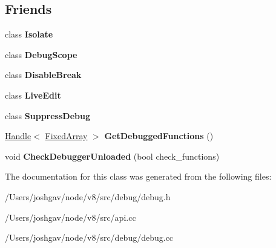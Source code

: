 \subsection*{Friends}
\begin{DoxyCompactItemize}
\item 
class {\bfseries Isolate}\hypertarget{classv8_1_1internal_1_1_debug_aba4f0964bdacf2bbf62cf876e5d28d0a}{}\label{classv8_1_1internal_1_1_debug_aba4f0964bdacf2bbf62cf876e5d28d0a}

\item 
class {\bfseries Debug\+Scope}\hypertarget{classv8_1_1internal_1_1_debug_a6cfbb0b64c1cf8e4443dc7e5900d8391}{}\label{classv8_1_1internal_1_1_debug_a6cfbb0b64c1cf8e4443dc7e5900d8391}

\item 
class {\bfseries Disable\+Break}\hypertarget{classv8_1_1internal_1_1_debug_ab05c0a5dd1563dece5579c13b74f5011}{}\label{classv8_1_1internal_1_1_debug_ab05c0a5dd1563dece5579c13b74f5011}

\item 
class {\bfseries Live\+Edit}\hypertarget{classv8_1_1internal_1_1_debug_a8ec7b8802068537635d90721ff6dc475}{}\label{classv8_1_1internal_1_1_debug_a8ec7b8802068537635d90721ff6dc475}

\item 
class {\bfseries Suppress\+Debug}\hypertarget{classv8_1_1internal_1_1_debug_a63087cbd2f6e778d5ceeb41df0a0bdc7}{}\label{classv8_1_1internal_1_1_debug_a63087cbd2f6e778d5ceeb41df0a0bdc7}

\item 
\hyperlink{classv8_1_1internal_1_1_handle}{Handle}$<$ \hyperlink{classv8_1_1internal_1_1_fixed_array}{Fixed\+Array} $>$ {\bfseries Get\+Debugged\+Functions} ()\hypertarget{classv8_1_1internal_1_1_debug_a478527a61be7002487ff08de6f4294c9}{}\label{classv8_1_1internal_1_1_debug_a478527a61be7002487ff08de6f4294c9}

\item 
void {\bfseries Check\+Debugger\+Unloaded} (bool check\+\_\+functions)\hypertarget{classv8_1_1internal_1_1_debug_a888c57a1d2bd5a7cc369bd47d97b0d45}{}\label{classv8_1_1internal_1_1_debug_a888c57a1d2bd5a7cc369bd47d97b0d45}

\end{DoxyCompactItemize}


The documentation for this class was generated from the following files\+:\begin{DoxyCompactItemize}
\item 
/\+Users/joshgav/node/v8/src/debug/debug.\+h\item 
/\+Users/joshgav/node/v8/src/api.\+cc\item 
/\+Users/joshgav/node/v8/src/debug/debug.\+cc\end{DoxyCompactItemize}
